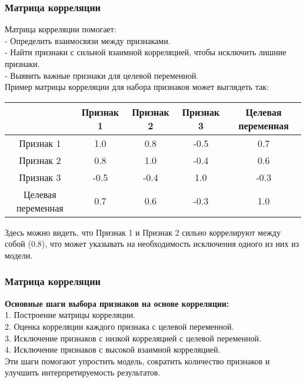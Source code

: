 \documentclass[aspectratio=169]{beamer}
\begin{document}
\begin{frame}
\frametitle{Матрица корреляции}
Матрица корреляции помогает:\\
- Определить взаимосвязи между признаками.\\
- Найти признаки с сильной взаимной корреляцией, чтобы исключить лишние признаки.\\
- Выявить важные признаки для целевой переменной.\\
Пример матрицы корреляции для набора признаков может выглядеть так:\\
\begin{center}
\begin{tabular}{ |c|c|c|c|c| } 
 \hline
  & Признак 1 & Признак 2 & Признак 3 & Целевая переменная \\ 
 \hline
 Признак 1 & 1.0 & 0.8 & -0.5 & 0.7\\
 \hline
 Признак 2 & 0.8 & 1.0 & -0.4 & 0.6\\
 \hline
 Признак 3 & -0.5 & -0.4 & 1.0 & -0.3\\
 \hline
 Целевая переменная & 0.7 & 0.6 & -0.3 & 1.0\\
 \hline
\end{tabular}
\end{center}
Здесь можно видеть, что Признак 1 и Признак 2 сильно коррелируют между собой (0.8), что может указывать на необходимость исключения одного из них из модели.
\end{frame}

\begin{frame}
\frametitle{Матрица корреляции}
{\bf Основные шаги выбора признаков на основе корреляции:}\\
1. Построение матрицы корреляции.\\
2. Оценка корреляции каждого признака с целевой переменной.\\
3. Исключение признаков с низкой корреляцией с целевой переменной.\\
4. Исключение признаков с высокой взаимной корреляцией.
\newline\\
Эти шаги помогают упростить модель, сократить количество признаков и улучшить интерпретируемость результатов.
\end{frame}
\end{document}
